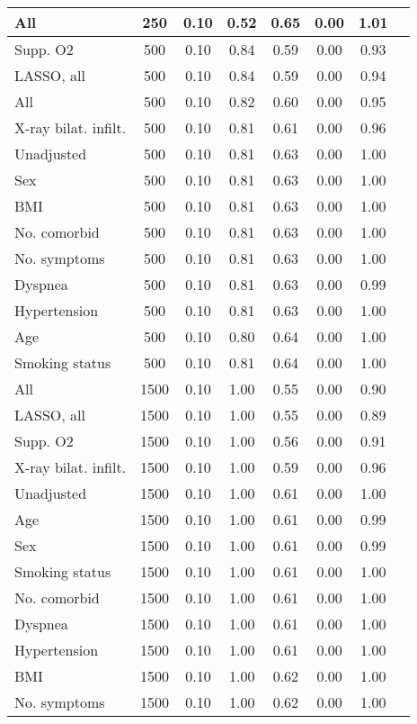 \documentclass{article}
\begin{document}
{\begin{longtable}{lccccccc}
All & 250 & 0.10 & 0.52 & 0.65 & 0.00 & 1.01 \\ \midrule 
Supp. O2 & 500 & 0.10 & 0.84 & 0.59 & 0.00 & 0.93 \\ 
LASSO, all & 500 & 0.10 & 0.84 & 0.59 & 0.00 & 0.94 \\ 
All & 500 & 0.10 & 0.82 & 0.60 & 0.00 & 0.95 \\ 
X-ray bilat. infilt. & 500 & 0.10 & 0.81 & 0.61 & 0.00 & 0.96 \\ 
Unadjusted & 500 & 0.10 & 0.81 & 0.63 & 0.00 & 1.00 \\ 
Sex & 500 & 0.10 & 0.81 & 0.63 & 0.00 & 1.00 \\ 
BMI & 500 & 0.10 & 0.81 & 0.63 & 0.00 & 1.00 \\ 
No. comorbid & 500 & 0.10 & 0.81 & 0.63 & 0.00 & 1.00 \\ 
No. symptoms & 500 & 0.10 & 0.81 & 0.63 & 0.00 & 1.00 \\ 
Dyspnea & 500 & 0.10 & 0.81 & 0.63 & 0.00 & 0.99 \\ 
Hypertension & 500 & 0.10 & 0.81 & 0.63 & 0.00 & 1.00 \\ 
Age & 500 & 0.10 & 0.80 & 0.64 & 0.00 & 1.00 \\ 
Smoking status & 500 & 0.10 & 0.81 & 0.64 & 0.00 & 1.00 \\ \midrule 
All & 1500 & 0.10 & 1.00 & 0.55 & 0.00 & 0.90 \\ 
LASSO, all & 1500 & 0.10 & 1.00 & 0.55 & 0.00 & 0.89 \\ 
Supp. O2 & 1500 & 0.10 & 1.00 & 0.56 & 0.00 & 0.91 \\ 
X-ray bilat. infilt. & 1500 & 0.10 & 1.00 & 0.59 & 0.00 & 0.96 \\ 
Unadjusted & 1500 & 0.10 & 1.00 & 0.61 & 0.00 & 1.00 \\ 
Age & 1500 & 0.10 & 1.00 & 0.61 & 0.00 & 0.99 \\ 
Sex & 1500 & 0.10 & 1.00 & 0.61 & 0.00 & 0.99 \\ 
Smoking status & 1500 & 0.10 & 1.00 & 0.61 & 0.00 & 1.00 \\ 
No. comorbid & 1500 & 0.10 & 1.00 & 0.61 & 0.00 & 1.00 \\ 
Dyspnea & 1500 & 0.10 & 1.00 & 0.61 & 0.00 & 1.00 \\ 
Hypertension & 1500 & 0.10 & 1.00 & 0.61 & 0.00 & 1.00 \\ 
BMI & 1500 & 0.10 & 1.00 & 0.62 & 0.00 & 1.00 \\ 
No. symptoms & 1500 & 0.10 & 1.00 & 0.62 & 0.00 & 1.00 \\
\bottomrule
\hline
\end{longtable}
}
\end{document}
